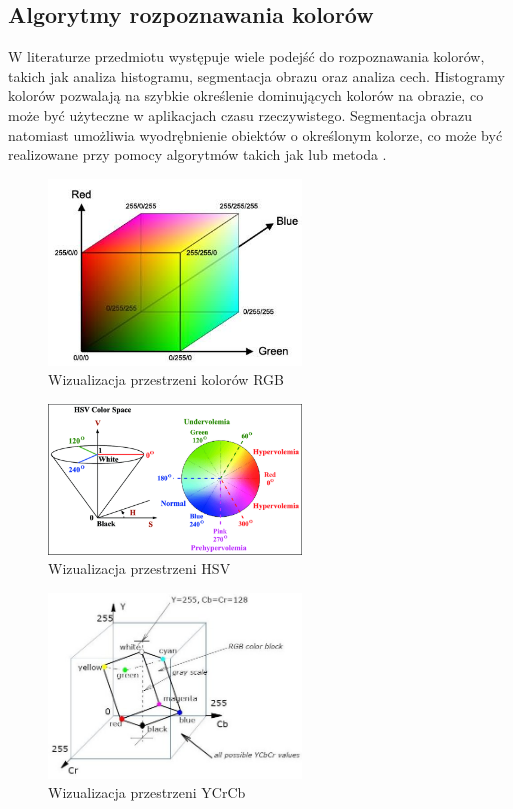 \subsection{Algorytmy rozpoznawania kolorów}

W literaturze przedmiotu występuje wiele podejść do rozpoznawania kolorów, takich jak analiza histogramu, segmentacja obrazu oraz analiza cech. Histogramy kolorów pozwalają na szybkie określenie dominujących kolorów na obrazie, co może być użyteczne w aplikacjach czasu rzeczywistego. Segmentacja obrazu natomiast umożliwia wyodrębnienie obiektów o określonym kolorze, co może być realizowane przy pomocy algorytmów takich jak  lub metoda .


\begin{figure}[h!]
    \centering
    \includegraphics[width=0.6\textwidth]{./graf/rgb-model.png}
    \caption{Wizualizacja przestrzeni kolorów RGB \cite{bib:rgb-model}}
    \label{rys2:rgb1}
\end{figure}

\begin{figure}[h!]
    \centering
    \includegraphics[width=0.6\textwidth]{./graf/hsv-model.png}
    \caption{Wizualizacja przestrzeni HSV \cite{bib:hsv-model}}
    \label{rys2:hsv1}
\end{figure}

\begin{figure}[h!]
    \centering
    \includegraphics[width=0.6\textwidth]{./graf/ycrcb-model.png}
    \caption{Wizualizacja przestrzeni YCrCb \cite{bib:ycrcb-model}}
    \label{rys2:ycrcb1}
\end{figure}


